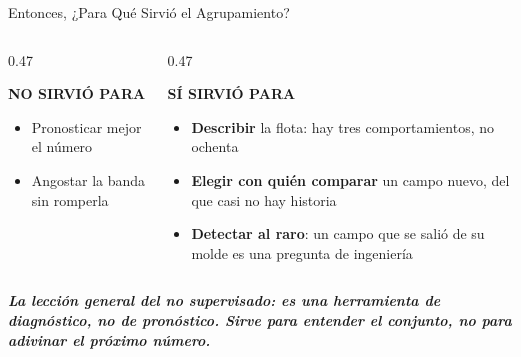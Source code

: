 \documentclass[aspectratio=169, 11pt]{beamer}
\begin{document}
\begin{frame}[shrink=8]{Entonces, ¿Para Qué Sirvió el Agrupamiento?}
  \vspace{2pt}
  \begin{columns}[T]
    \begin{column}{0.47\textwidth}
      \begin{tcolorbox}[colback=arcaGray, colframe=arcaRed, boxrule=0pt,
        leftrule=3pt, arc=3pt, left=8pt, right=8pt, top=6pt, bottom=6pt]
        {\scriptsize\color{arcaRed}\bfseries NO SIRVIÓ PARA}\\[5pt]
        {\footnotesize\color{textMuted}
        \begin{itemize}\setlength{\itemsep}{4pt}
          \item[{\color{arcaRed}\scriptsize\faTimes}]
            Pronosticar mejor el número
          \item[{\color{arcaRed}\scriptsize\faTimes}]
            Angostar la banda sin romperla
        \end{itemize}}
      \end{tcolorbox}
    \end{column}
    \begin{column}{0.47\textwidth}
      \begin{tcolorbox}[colback=arcaGray, colframe=codeGreen, boxrule=0pt,
        leftrule=3pt, arc=3pt, left=8pt, right=8pt, top=6pt, bottom=6pt]
        {\scriptsize\color{codeGreen}\bfseries SÍ SIRVIÓ PARA}\\[5pt]
        {\footnotesize\color{textMuted}
        \begin{itemize}\setlength{\itemsep}{4pt}
          \item[{\color{codeGreen}\scriptsize\faCheck}]
            \textbf{Describir} la flota: hay tres comportamientos, no ochenta
          \item[{\color{codeGreen}\scriptsize\faCheck}]
            \textbf{Elegir con quién comparar} un campo nuevo, del que casi no
            hay historia
          \item[{\color{codeGreen}\scriptsize\faCheck}]
            \textbf{Detectar al raro}: un campo que se salió de su molde es una
            pregunta de ingeniería
        \end{itemize}}
      \end{tcolorbox}
    \end{column}
  \end{columns}
  \vspace{9pt}
  {\footnotesize\color{arcaDark}\bfseries\itshape
   La lección general del no supervisado: es una herramienta de
   \textbf{diagnóstico}, no de pronóstico. Sirve para \emph{entender} el
   conjunto, no para adivinar el próximo número.}
\end{frame}
\end{document}
